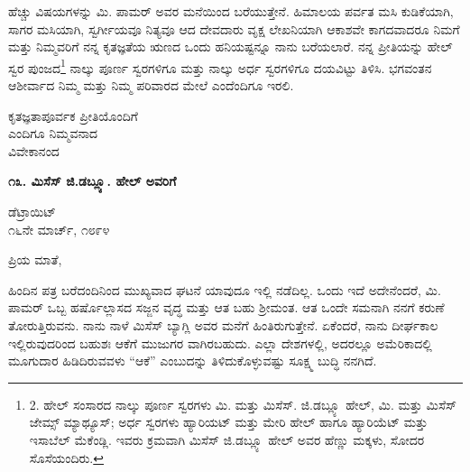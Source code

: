 ಹೆಚ್ಚು ವಿಷಯಗಳನ್ನು ಮಿ. ಪಾಮರ್ ಅವರ ಮನೆಯಿಂದ ಬರೆಯುತ್ತೇನೆ. ಹಿಮಾಲಯ ಪರ್ವತ ಮಸಿ ಕುಡಿಕೆಯಾಗಿ, ಸಾಗರ ಮಸಿಯಾಗಿ, ಸ್ವರ್ಗೀಯವೂ ನಿತ್ಯವೂ ಆದ ದೇವದಾರು ವೃಕ್ಷ ಲೇಖನಿಯಾಗಿ ಆಕಾಶವೇ ಕಾಗದವಾದರೂ ನಿಮಗೆ ಮತ್ತು ನಿಮ್ಮವರಿಗೆ ನನ್ನ ಕೃತಜ್ಞತೆಯ ಋಣದ ಒಂದು ಹನಿಯಷ್ಟನ್ನೂ ನಾನು ಬರೆಯಲಾರೆ. ನನ್ನ ಪ್ರೀತಿಯನ್ನು ಹೇಲ್ ಸ್ವರ ಪುಂಜದ\footnote{2. ಹೇಲ್ ಸಂಸಾರದ ನಾಲ್ಕು ಪೂರ್ಣ ಸ್ವರಗಳು ಮಿ. ಮತ್ತು ಮಿಸೆಸ್. ಜಿ.ಡಬ್ಲ್ಯೂ ಹೇಲ್, ಮಿ. ಮತ್ತು ಮಿಸೆಸ್ ಜೇಮ್ಸ್ ಮ್ಯಾಥ್ಯೂಸ್; ಅರ್ಧ ಸ್ವರಗಳು ಹ್ಯಾರಿಯಟ್ ಮತ್ತು ಮೇರಿ ಹೇಲ್ ಹಾಗೂ ಹ್ಯಾರಿಯೆಟ್ ಮತ್ತು ಇಸಾಬೆಲ್ ಮೆಕೆಂಡ್ಲಿ. ಇವರು ಕ್ರಮವಾಗಿ ಮಿಸೆಸ್ ಜಿ.ಡಬ್ಲ್ಯೂ ಹೇಲ್ ಅವರ ಹೆಣ್ಣು ಮಕ್ಕಳು, ಸೋದರ ಸೊಸೆಯಂದಿರು.} ನಾಲ್ಕು ಪೂರ್ಣ ಸ್ವರಗಳಿಗೂ ಮತ್ತು ನಾಲ್ಕು ಅರ್ಧ ಸ್ವರಗಳಿಗೂ ದಯವಿಟ್ಟು ತಿಳಿಸಿ. ಭಗವಂತನ ಆಶೀರ್ವಾದ ನಿಮ್ಮ ಮತ್ತು ನಿಮ್ಮ ಪರಿವಾರದ ಮೇಲೆ ಎಂದೆಂದಿಗೂ ಇರಲಿ.

\begin{flushright}
ಕೃತಜ್ಞತಾಪೂರ್ವಕ ಪ್ರೀತಿಯೊಂದಿಗೆ\\ಎಂದಿಗೂ ನಿಮ್ಮವನಾದ\\ವಿವೇಕಾನಂದ
\end{flushright}

\begin{center}
\textbf{೧೩. ಮಿಸೆಸ್ ಜಿ.ಡಬ್ಲ್ಯೂ. ಹೇಲ್ ಅವರಿಗೆ}
\end{center}

\begin{flushright}
ಡೆಟ್ರಾಯಿಟ್\\೧೬ನೇ ಮಾರ್ಚ್, ೧೮೯೪
\end{flushright}

ಪ್ರಿಯ ಮಾತೆ,

ಹಿಂದಿನ ಪತ್ರ ಬರೆದಂದಿನಿಂದ ಮುಖ್ಯವಾದ ಘಟನೆ ಯಾವುದೂ ಇಲ್ಲಿ ನಡೆದಿಲ್ಲ. ಒಂದು ಇದೆ ಅದೇನೆಂದರೆ, ಮಿ. ಪಾಮರ್ ಒಬ್ಬ ಹರ್ಷೊಲ್ಲಾಸದ ಸಜ್ಜನ ವೃದ್ಧ ಮತ್ತು ಆತ ಬಹು ಶ‍್ರೀಮಂತ. ಆತ ಒಂದೇ ಸಮನಾಗಿ ನನಗೆ ಕರುಣೆ ತೋರುತ್ತಿರುವನು. ನಾನು ನಾಳೆ ಮಿಸೆಸ್ ಬ್ಯಾಗ್ಲಿ ಅವರ ಮನೆಗೆ ಹಿಂತಿರುಗುತ್ತೇನೆ. ಏಕೆಂದರೆ, ನಾನು ದೀರ್ಘಕಾಲ ಇಲ್ಲಿರುವುದರಿಂದ ಬಹುಶಃ ಆಕೆಗೆ ಮುಜುಗರ ವಾಗಿರಬಹುದು. ಎಲ್ಲಾ ದೇಶಗಳಲ್ಲಿ, ಅದರಲ್ಲೂ ಅಮೆರಿಕಾದಲ್ಲಿ ಮೂಗುದಾರ ಹಿಡಿದಿರುವವಳು “ಆಕೆ” ಎಂಬುದನ್ನು ತಿಳಿದುಕೊಳ್ಳುವಷ್ಟು ಸೂಕ್ಷ್ಮ ಬುದ್ಧಿ ನನಗಿದೆ.

